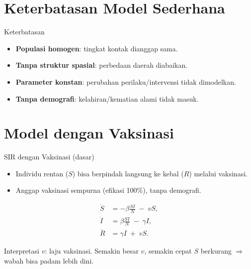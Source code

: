 \documentclass[aspectratio=32]{beamer}
\newcommand{\jsg}[1]{\textcolor{teal!60!black}{\textbf{#1}}}
\begin{document}
\section{Keterbatasan Model Sederhana}

\begin{frame}{Keterbatasan}
\begin{itemize}
  \item \jsg{Populasi homogen}: tingkat kontak dianggap sama.
  \item \jsg{Tanpa struktur spasial}: perbedaan daerah diabaikan.
  \item \jsg{Parameter konstan}: perubahan perilaku/intervensi tidak dimodelkan.
  \item \jsg{Tanpa demografi}: kelahiran/kematian alami tidak masuk.
\end{itemize}
\end{frame}

\section{Model dengan Vaksinasi}

\begin{frame}{SIR dengan Vaksinasi (dasar)}
\begin{itemize}
  \item Individu rentan ($S$) bisa berpindah langsung ke kebal ($R$) melalui vaksinasi.
  \item Anggap vaksinasi sempurna (efikasi 100\%), tanpa demografi.
\end{itemize}
\[
\begin{aligned}
\dot S &= -\beta \tfrac{S I}{N} \;-\; vS, \\
\dot I &= \beta \tfrac{S I}{N} \;-\; \gamma I, \\
\dot R &= \gamma I \;+\; vS.
\end{aligned}
\]
\begin{block}{Interpretasi}
$v$: laju vaksinasi. Semakin besar $v$, semakin cepat $S$ berkurang $\Rightarrow$ wabah bisa padam lebih dini.
\end{block}
\end{frame}

\end{document}
